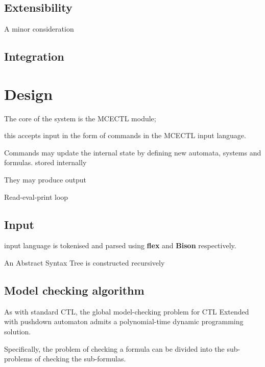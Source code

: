 \documentclass[11pt]{article}
\begin{document}
\subsection{Extensibility}

A minor consideration 

\subsection{Integration}

\section{Design}







The core of the system is the MCECTL module; 

this accepts input in the form of commands in the MCECTL input language. 

Commands may update the internal state by defining new automata, systems and formulas.
stored internally

They may produce output

Read-eval-print loop


\subsection{Input}
input language is tokenised and parsed using \textbf{flex} and \textbf{Bison} respectively. 

An Abstract Syntax Tree is constructed recursively 




\subsection{Model checking algorithm}

As with standard CTL, the global model-checking problem for CTL Extended with
pushdown automaton admits a polynomial-time dynamic programming solution.

Specifically, the problem of checking a formula can be divided into the
sub-problems of checking the sub-formulas. %
\end{document}
